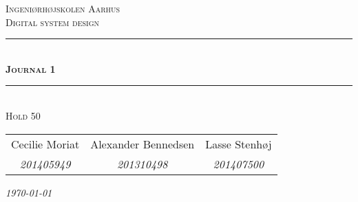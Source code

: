 \begin{titlepage}
	
\newcommand{\HRule}{\rule{\linewidth}{0.1mm}} %
	
\begin{center}
	
\textsc{\LARGE Ingeniørhøjskolen Aarhus}\\[1.5cm] %

\textsc{\large Digital system design}\\[2.5cm] 
\HRule \\[0.8cm]
{\huge \bfseries \textsc{Journal 1}}\\[0.4cm]
\HRule \\[1.5cm]

\textsc{\large Hold 50}\\
\vspace{0.5 in}
\begin{tabular}{c c c}
	Cecilie Moriat &  Alexander Bennedsen & Lasse Stenhøj \\
	\textsl{201405949} & \textsl{201310498} & \textsl{201407500}
\end{tabular}

\vspace{2.5 in}

{\large\textit{\today}} \\[3cm]
\vfill %
\end{center} %
\end{titlepage}
